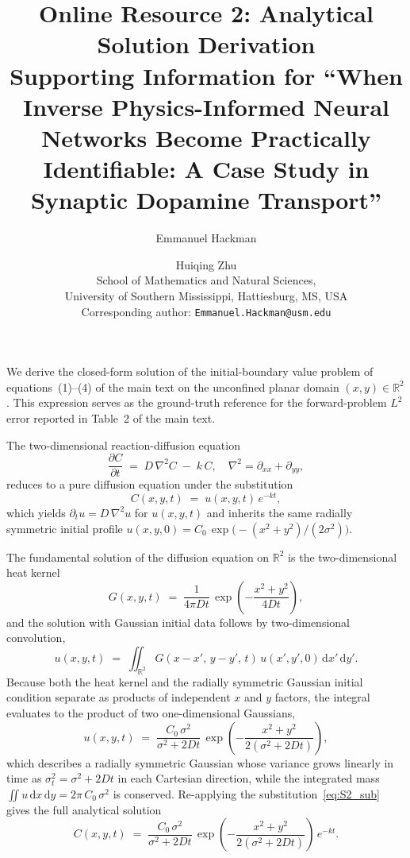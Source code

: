 \documentclass[12pt]{article}
\title{Online Resource 2: Analytical Solution Derivation \\
\large Supporting Information for ``When Inverse
Physics-Informed Neural Networks Become Practically
Identifiable: A Case Study in Synaptic Dopamine Transport''}
\author{Emmanuel Hackman \and Huiqing Zhu \\
School of Mathematics and Natural Sciences, \\
University of Southern Mississippi, Hattiesburg, MS, USA \\
Corresponding author: \texttt{Emmanuel.Hackman@usm.edu}}
\date{}
\begin{document}
\maketitle

We derive the closed-form solution of the initial-boundary
value problem of equations~(1)--(4) of the main text on the
unconfined planar domain $(x, y) \in \mathbb{R}^2$. This
expression serves as the ground-truth reference for the
forward-problem $L^2$ error reported in Table~2 of the main
text.

The two-dimensional reaction-diffusion equation
\begin{equation}
  \frac{\partial C}{\partial t}
  \;=\; D\, \nabla^2 C \;-\; k\, C,
  \quad \nabla^2 = \partial_{xx} + \partial_{yy},
  \label{eq:S2_pde}
\end{equation}
reduces to a pure diffusion equation under the substitution
\begin{equation}
  C(x, y, t) \;=\; u(x, y, t)\, e^{-k t},
  \label{eq:S2_sub}
\end{equation}
which yields $\partial_t u = D\, \nabla^2 u$ for $u(x, y, t)$
and inherits the same radially symmetric initial profile
$u(x, y, 0) = C_0\, \exp\!\big(-(x^2 + y^2) / (2\sigma^2)\big)$.

The fundamental solution of the diffusion equation on
$\mathbb{R}^2$ is the two-dimensional heat kernel
\begin{equation}
  G(x, y, t) \;=\;
  \frac{1}{4\pi D t}\,
  \exp\!\left( -\frac{x^2 + y^2}{4 D t} \right),
  \label{eq:S2_kernel}
\end{equation}
and the solution with Gaussian initial data follows by
two-dimensional convolution,
\begin{equation}
  u(x, y, t) \;=\;
  \iint_{\mathbb{R}^2}
    G(x - x',\, y - y',\, t)\, u(x', y', 0)\, \mathrm{d}x'\,
    \mathrm{d}y'.
  \label{eq:S2_conv}
\end{equation}
Because both the heat kernel and the radially symmetric
Gaussian initial condition separate as products of independent
$x$ and $y$ factors, the integral evaluates to the product of
two one-dimensional Gaussians,
\begin{equation}
  u(x, y, t) \;=\;
  \frac{C_0\, \sigma^2}{\sigma^2 + 2 D t}\,
  \exp\!\left( -\frac{x^2 + y^2}{2(\sigma^2 + 2 D t)} \right),
  \label{eq:S2_diffusion}
\end{equation}
which describes a radially symmetric Gaussian whose variance
grows linearly in time as
$\sigma_t^2 = \sigma^2 + 2 D t$ in each Cartesian direction,
while the integrated mass
$\iint u\, \mathrm{d}x\, \mathrm{d}y = 2\pi\, C_0\, \sigma^2$
is conserved. Re-applying the substitution~\eqref{eq:S2_sub}
gives the full analytical solution
\begin{equation}
  \boxed{\;
  C(x, y, t) \;=\;
  \frac{C_0\, \sigma^2}{\sigma^2 + 2 D t}\,
  \exp\!\left( -\frac{x^2 + y^2}{2(\sigma^2 + 2 D t)} \right)
  \, e^{-k t}.
  \;}
  \label{eq:S2_full}
\end{equation}
\end{document}
